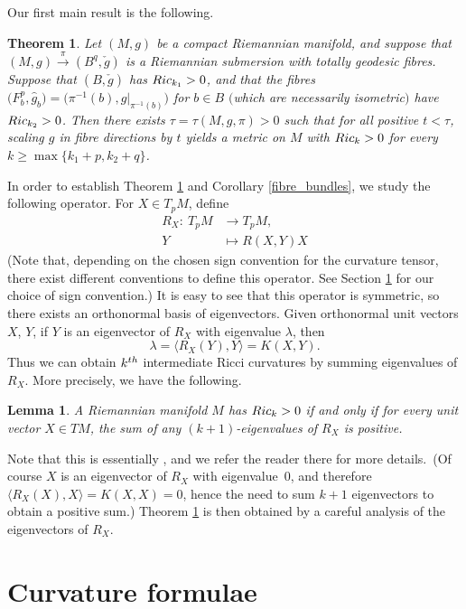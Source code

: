 \documentclass[11pt]{article}
\numberwithin{equation}{section}
\newtheorem{TheoremAlph}{Theorem}
\numberwithin{equation}{section}
\newtheorem{Lemma}[Theorem]{Lemma}
\begin{document}
Our first main result is the following.

\begin{TheoremAlph}\label{main}
	Let $(M,g)$ be a compact Riemannian manifold, and suppose that $(M,g)\xrightarrow{\pi} (B^q,\check{g})$ is a Riemannian submersion with totally geodesic fibres. Suppose that $(B,\check{g})$ has ${\rm Ric}_{k_1}>0$, and that the fibres $\bigl(F_b^p,\hat{g}_b\bigr)=\bigl(\pi^{-1}(b),g|_{\pi^{-1}(b)}\bigr)$ for $b \in B$ $($which are necessarily isometric$)$ have ${\rm Ric}_{k_2}>0$. Then there exists $\tau=\tau(M,g,\pi)>0$ such that for all positive $t<\tau$, scaling $g$ in fibre directions by $t$ yields a metric on $M$ with ${\rm Ric}_k>0$ for every $k\ge \max\{k_1+p,k_2+q\}$.	
\end{TheoremAlph}


In order to establish Theorem \ref{main} and Corollary \ref{fibre_bundles}, we study the following operator. For $X \in T_pM$, define
\begin{align*}
	R_X\colon \ T_pM &\to T_pM, \\
	Y &\mapsto R(X,Y)X
\end{align*}
(Note that, depending on the chosen sign convention for the curvature tensor, there exist different conventions to define this operator. See Section \ref{formulas} for our choice of sign convention.)
It is easy to see that this operator is symmetric, so there exists an orthonormal basis of eigenvectors. Given orthonormal unit vectors $X$, $Y$, if $Y$ is an eigenvector of $R_X$ with eigenvalue $\lambda$, then \[\lambda=\langle R_X(Y),Y\rangle=K(X,Y).\] Thus we can obtain $k^{\rm th}$ intermediate Ricci curvatures by summing eigenvalues of $R_X$. More precisely, we have the following.
\begin{Lemma}\label{k+1}
	A Riemannian manifold $M$ has ${\rm Ric}_k>0$ if and only if for every unit vector $X \in TM$, the sum of any $(k+1)$-eigenvalues of $R_X$ is positive.
\end{Lemma}
Note that this is essentially \cite[Lemma 2.6]{RW}, and we refer the reader there for more details.~(Of course $X$ is an eigenvector of $R_X$ with eigenvalue~0, and therefore $\langle R_X(X),X\rangle =K(X,X)=0$, hence the need to sum $k+1$ eigenvectors to obtain a positive sum.) Theorem \ref{main} is then obtained by a careful analysis of the eigenvectors of $R_X$.


\section{Curvature formulae}\label{formulas}
\end{document}
